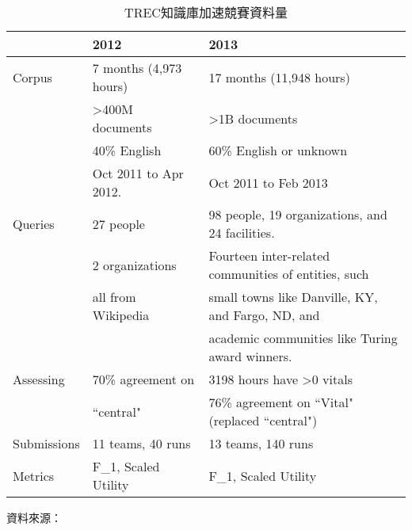 \begin{table}
    \centering
    \footnotesize
    \begin{tabular}{|l|l|l|}
        \hline
            & 2012 & 2013 \\ \hline
        Corpus & 7 months (4,973 hours) & 17 months (11,948 hours)\\
            & >400M documents & >1B documents\\
            & 40\% English & 60\% English or unknown\\
        & Oct 2011 to Apr 2012. & Oct 2011 to Feb 2013\\
        \hline
        Queries & 27 people & 98 people, 19 organizations, and 24 facilities. \\
                & 2 organizations & Fourteen inter-related communities of entities, such \\
                & all from Wikipedia & small towns like Danville, KY, and Fargo, ND, and \\
        & & academic communities like Turing award winners. \\
        Assessing & 70\% agreement on & 3198 hours have >0 vitals \\
        & ``central" & 76\% agreement on ``Vital" (replaced ``central") \\
        \hline
        Submissions & 11 teams, 40 runs & 13 teams, 140 runs \\
        \hline
        Metrics & F\_1, Scaled Utility & F\_1, Scaled Utility \\
        \hline
    \end{tabular}
    \caption{TREC知識庫加速競賽資料量}
    \label{t:kba-corps}
    \normalsize
    資料來源：\cite{kba2013}
\end{table}
